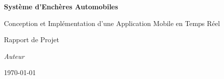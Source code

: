 \documentclass[a4paper,12pt]{report}
\begin{document}
\begin{titlepage}
    \centering
    \vspace*{1cm}
    {\Huge\bfseries Système d'Enchères Automobiles\par}
    \vspace{1.5cm}
    {\Large Conception et Implémentation d'une Application Mobile en Temps Réel\par}
    \vspace{2cm}
    {\Large Rapport de Projet\par}
    \vspace{3cm}
    {\Large\itshape Auteur\par}
    \vspace{3cm}
    {\large \today\par}
\end{titlepage}






\tableofcontents
\listoffigures
\listoftables
\clearpage














\printbibliography[heading=bibintoc, title={Bibliographie}]
\end{document}
